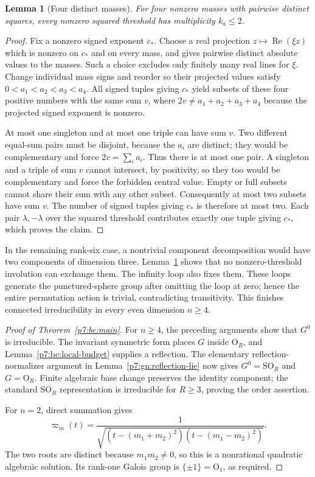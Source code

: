 \documentclass[11pt,a4paper]{article}
\newtheorem{lemma}[theorem]{Lemma}
\theoremstyle{definition}
\theoremstyle{remark}
\numberwithin{equation}{section}
\begin{document}
\begin{lemma}[Four distinct masses]\label{p7:be:four}
For four nonzero masses with pairwise distinct squares, every
nonzero squared threshold has multiplicity $k_a\leq2$.
\end{lemma}
\begin{proof}
Fix a nonzero signed exponent $c_*$. Choose a real projection
$z\mapsto\operatorname{Re}(\xi z)$ which is nonzero on $c_*$
and on every mass, and gives pairwise distinct absolute values
to the masses. Such a choice excludes only finitely many real
lines for $\xi$. Change individual mass signs and reorder so
their projected values satisfy $0<a_1<a_2<a_3<a_4$.
All signed tuples giving $c_*$ yield subsets of these four
positive numbers with the same sum $v$, where
$2v\ne a_1+a_2+a_3+a_4$ because the projected signed exponent
is nonzero.

At most one singleton and at most one triple can have sum $v$.
Two different equal-sum pairs must be disjoint, because the
$a_i$ are distinct; they would be complementary and force
$2v=\sum_i a_i$. Thus there is at most one pair. A singleton
and a triple of sum $v$ cannot intersect, by positivity, so
they too would be complementary and force the forbidden
central value. Empty or full subsets cannot share their sum
with any other subset. Consequently at most two subsets
have sum $v$.  The number of signed tuples giving $c_*$ is
therefore at most two. Each pair $\lambda,-\lambda$ over the
squared threshold contributes exactly one tuple giving $c_*$,
which proves the claim.
\end{proof}

In the remaining rank-six case, a nontrivial component
decomposition would have two components of dimension three.
Lemma~\ref{p7:be:four} shows that no nonzero-threshold involution
can exchange them. The infinity loop also fixes them.
These loops generate the punctured-sphere group after omitting
the loop at zero; hence the entire permutation action is trivial,
contradicting transitivity. This finishes connected irreducibility
in every even dimension $n\geq4$.

\begin{proof}[Proof of Theorem~\ref{p7:be:main}]
For $n\geq4$, the preceding arguments show that $G^0$ is
irreducible. The invariant symmetric form places $G$ inside
$\mathrm O_R$, and Lemma~\ref{p7:be:local-budget} supplies a
reflection. The elementary reflection-normalizer argument in
Lemma~\ref{p7:gn:reflection-lie} now gives
$G^0=\mathrm{SO}_R$ and $G=\mathrm O_R$.
Finite algebraic base change preserves the identity component;
the standard $\mathrm{SO}_R$ representation is irreducible
for $R\geq3$, proving the order assertion.

For $n=2$, direct summation gives
\[
 \varpi_m(t)=
 \frac1{\sqrt{(t-(m_1+m_2)^2)(t-(m_1-m_2)^2)}}.
\]
The two roots are distinct because $m_1m_2\ne0$, so this is
a nonrational quadratic algebraic solution. Its rank-one
Galois group is $\{\pm1\}=\mathrm O_1$, as required.
\end{proof}
\end{document}

